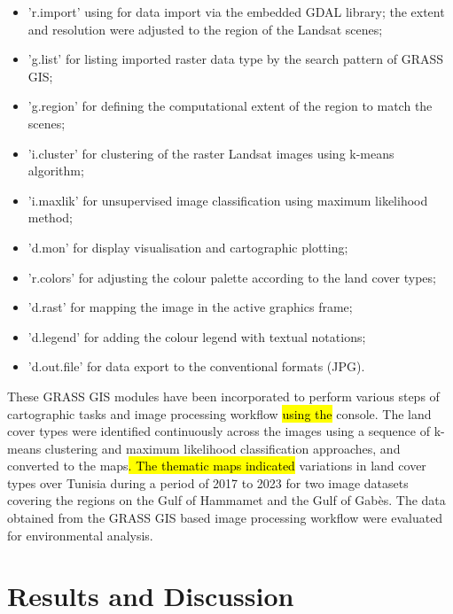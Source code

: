 \documentclass[land,article,submit,pdftex,moreauthors]{Definitions/mdpi}
\begin{document}
\begin{itemize}
	\item 'r.import' using for data import via the embedded GDAL library; the extent and resolution were adjusted to the region of the Landsat scenes;
	\item 'g.list' for listing imported raster data type by the search pattern of GRASS GIS; 
	\item 'g.region' for defining the computational extent of the region to match the scenes; 
	\item 'i.cluster' for clustering of the raster Landsat images using k-means algorithm; 
	\item 'i.maxlik' for unsupervised image classification using maximum likelihood method; 
	\item 'd.mon' for display visualisation and cartographic plotting; 
	\item 'r.colors' for adjusting the colour palette according to the land cover types; 
	\item 'd.rast' for mapping the image in the active graphics frame; 
	\item 'd.legend' for adding the colour legend with textual notations; 
	\item 'd.out.file' for data export to the conventional formats (JPG). 
\end{itemize}

These GRASS GIS modules have been incorporated to perform various steps of cartographic tasks and image processing workflow \hl{using the} console. The land cover types were identified continuously across the images using a sequence of k-means clustering and maximum likelihood classification approaches, and converted to the maps\hl{. The thematic maps indicated }variations in land cover types over Tunisia during a period of 2017 to 2023 for two image datasets covering the regions on the Gulf of Hammamet and the Gulf of Gabès. The data obtained from the GRASS GIS based image processing workflow were evaluated for environmental analysis.

\section{Results and Discussion}
\end{document}
